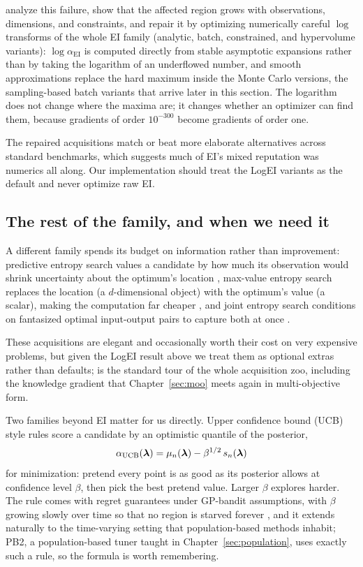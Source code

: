 \citet{ament2023logei} analyze this failure, show that
the affected region grows with observations, dimensions, and constraints,
and repair it by optimizing numerically careful $\log$ transforms of the
whole EI family (analytic, batch, constrained, and hypervolume variants):
$\log \alpha_{\mathrm{EI}}$ is computed directly from stable asymptotic
expansions rather than by taking the logarithm of an underflowed number,
and smooth approximations replace the hard maximum inside the Monte
Carlo versions, the sampling-based batch variants that arrive later in
this section. The logarithm does not change where the maxima are; it changes
whether an optimizer can find them, because gradients of order
$10^{-300}$ become gradients of order one.

The repaired acquisitions
match or beat more elaborate alternatives across standard benchmarks,
which suggests much of EI's mixed reputation was numerics all along. Our
implementation should treat the LogEI variants as the default and never
optimize raw EI.

\subsection{The rest of the family, and when we need it}

A different family spends its budget on information rather than
improvement: predictive entropy search values a candidate by how much its
observation would shrink uncertainty about the optimum's location
\citep{hernandez2014pes}, max-value entropy search replaces the location
(a $d$-dimensional object) with the optimum's value (a scalar), making the
computation far cheaper \citep{wang2017mes}, and joint entropy search
conditions on fantasized optimal input-output pairs to capture both at
once \citep{hvarfner2022jes}.

These acquisitions are elegant and
occasionally worth their cost on very expensive problems, but given the
LogEI result above we treat them as optional extras rather than defaults;
\citet{frazier2018tutorial} is the standard tour of the whole acquisition
zoo, including the knowledge gradient that Chapter~\ref{sec:moo} meets
again in multi-objective form.

Two families beyond EI matter for us directly. Upper confidence bound
(UCB) style rules score a candidate by an optimistic quantile of the
posterior,
\begin{equation}
\alpha_{\mathrm{UCB}}(\bm{\lambda})
= \mu_n(\bm{\lambda}) - \beta^{1/2}\, s_n(\bm{\lambda})
\label{eq:ucb}
\end{equation}
for minimization: pretend every point is as good as its posterior allows
at confidence level $\beta$, then pick the best pretend value. Larger
$\beta$ explores harder. The rule comes with regret guarantees under
GP-bandit assumptions, with $\beta$ growing slowly over time so that no
region is starved forever \citep{srinivas2010gaussian}, and it extends
naturally to the time-varying setting that population-based methods
inhabit; PB2, a population-based tuner taught in
Chapter~\ref{sec:population}, uses exactly such a rule, so
the formula is worth remembering.

